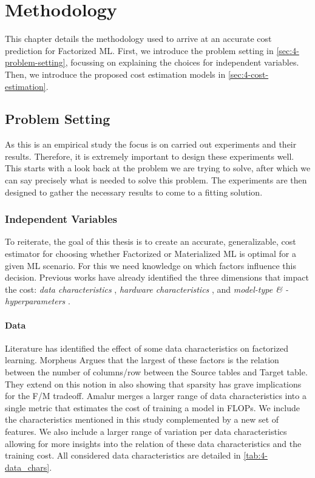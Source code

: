 
\chapter{Methodology}

\label{chapter:methodology}

This chapter details the methodology used to arrive at an accurate cost prediction for Factorized ML. First, we introduce the problem setting in \autoref{sec:4-problem-setting}, focussing on explaining the choices for independent variables. Then, we introduce the proposed cost estimation models in \autoref{sec:4-cost-estimation}.

\section{Problem Setting}
\label{sec:4-problem-setting}

As this is an empirical study the focus is on carried out experiments and their results. Therefore, it is extremely important to design these experiments well. This starts with a look back at the problem we are trying to solve, after which we can say precisely what is needed to solve this problem. The experiments are then designed to gather the necessary results to come to a fitting solution.

\subsection{Independent Variables}
To reiterate, the goal of this thesis is to create an accurate, generalizable, cost estimator for choosing whether Factorized or Materialized ML is optimal for a given ML scenario. For this we need knowledge on which factors influence this decision. Previous works have already identified the three dimensions that impact the cost: \emph{data characteristics} \cite{morpheus, amalur,schijndel_cost_estimation}, \emph{hardware characteristics} \cite{orion_learning_gen_lin_models}, and \emph{model-type \& -hyperparameters} \cite{amalur,schijndel_cost_estimation}.

\subsubsection{Data}
Literature has identified the effect of some data characteristics on factorized learning. Morpheus \cite{morpheus} Argues that the largest of these factors is the relation between the number of columns/row between the Source tables and Target table. They extend on this notion in \cite{MorpheusFIEnablingOptimizingNonlinear2019} also showing that sparsity has grave implications for the F/M tradeoff. Amalur \cite{amalur} merges a larger range of data characteristics into a single metric that estimates the cost of training a model in FLOPs. We include the characteristics mentioned in this study complemented by a new set of features. We also include a larger range of variation per data characteristics allowing for more insights into the relation of these data characteristics and the training cost. All considered data characteristics are detailed in \autoref{tab:4-data_chars}.

